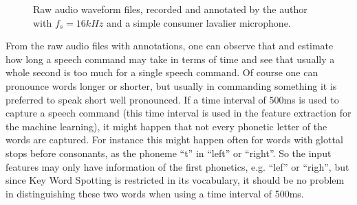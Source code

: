 \begin{figure}[!ht]
  \centering
  \caption{Raw audio waveform files, recorded and annotated by the author with $f_s=16kHz$ and a simple consumer lavalier microphone.}
  \label{fig:raw_audio_my}
\end{figure}
\FloatBarrier
\noindent
From the raw audio files with annotations, one can observe that and estimate how long a speech command may take in terms of time and see that usually a whole second is too much for a single speech command.
Of course one can pronounce words longer or shorter, but usually in commanding something it is preferred to speak short well pronounced.
If a time interval of 500ms is used to capture a speech command (this time interval is used in the feature extraction for the machine learning), it might happen that not every phonetic letter of the words are captured. For instance this might happen often for words with glottal stops before consonants, as the phoneme \enquote{t} in \enquote{left} or \enquote{right}.
So the input features may only have information of the first phonetics, e.g. \enquote{lef} or \enquote{righ}, but since Key Word Spotting is restricted in its vocabulary, it should be no problem in distinguishing these two words when using a time interval of 500ms.

